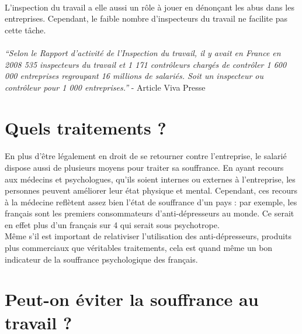 \documentclass{report}
\begin{document}
		\paragraph{}
			L'inspection du travail a elle aussi un rôle à jouer en dénonçant les abus dans les entreprises. Cependant, le faible nombre d'inspecteurs du travail ne facilite pas cette tâche.
		\paragraph{}
			\textit{``Selon le Rapport d’activité de l’Inspection du travail, il y avait en France en 2008 535 inspecteurs du travail et 1 171 contrôleurs chargés de contrôler 1 600 000 entreprises regroupant 16 millions de salariés.
			Soit un inspecteur ou contrôleur pour 1 000 entreprises.''} - Article Viva Presse
	\section{Quels traitements ?}
		\paragraph{}
			En plus d'être légalement en droit de se retourner contre l'entreprise, le salarié dispose aussi de plusieurs moyens pour traiter sa souffrance. En ayant recours aux médecins et psychologues, qu'ils soient internes ou externes à l'entreprise, les personnes peuvent améliorer leur état physique et mental. Cependant, ces recours à la médecine reflètent assez bien l'état de souffrance d'un pays : par exemple, les français sont les premiers consommateurs d'anti-dépresseurs au monde. Ce serait en effet plus d'un français sur 4 qui serait sous psychotrope.\\
			Même s'il est important de relativiser l'utilisation des anti-dépresseurs, produits plus commerciaux que véritables traitements, cela est quand même un bon indicateur de la souffrance psychologique des français.
	\section{Peut-on éviter la souffrance au travail ?}
\end{document}

